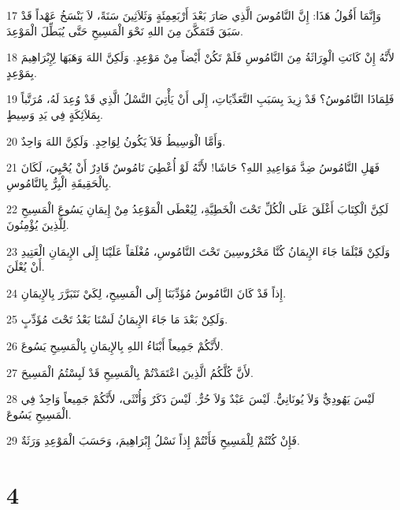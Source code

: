 \par 17 وَإِنَّمَا أَقُولُ هَذَا: إِنَّ النَّامُوسَ الَّذِي صَارَ بَعْدَ أَرْبَعِمِئَةٍ وَثَلاَثِينَ سَنَةً، لاَ يَنْسَخُ عَهْداً قَدْ سَبَقَ فَتَمَكَّنَ مِنَ اللهِ نَحْوَ الْمَسِيحِ حَتَّى يُبَطِّلَ الْمَوْعِدَ.
\par 18 لأَنَّهُ إِنْ كَانَتِ الْوِرَاثَةُ مِنَ النَّامُوسِ فَلَمْ تَكُنْ أَيْضاً مِنْ مَوْعِدٍ. وَلَكِنَّ اللهَ وَهَبَهَا لِإِبْرَاهِيمَ بِمَوْعِدٍ.
\par 19 فَلِمَاذَا النَّامُوسُ؟ قَدْ زِيدَ بِسَبَبِ التَّعَدِّيَاتِ، إِلَى أَنْ يَأْتِيَ النَّسْلُ الَّذِي قَدْ وُعِدَ لَهُ، مُرَتَّباً بِمَلاَئِكَةٍ فِي يَدِ وَسِيطٍ.
\par 20 وَأَمَّا الْوَسِيطُ فَلاَ يَكُونُ لِوَاحِدٍ. وَلَكِنَّ اللهَ وَاحِدٌ.
\par 21 فَهَلِ النَّامُوسُ ضِدَّ مَوَاعِيدِ اللهِ؟ حَاشَا! لأَنَّهُ لَوْ أُعْطِيَ نَامُوسٌ قَادِرٌ أَنْ يُحْيِيَ، لَكَانَ بِالْحَقِيقَةِ الْبِرُّ بِالنَّامُوسِ.
\par 22 لَكِنَّ الْكِتَابَ أَغْلَقَ عَلَى الْكُلِّ تَحْتَ الْخَطِيَّةِ، لِيُعْطَى الْمَوْعِدُ مِنْ إِيمَانِ يَسُوعَ الْمَسِيحِ لِلَّذِينَ يُؤْمِنُونَ.
\par 23 وَلَكِنْ قَبْلَمَا جَاءَ الإِيمَانُ كُنَّا مَحْرُوسِينَ تَحْتَ النَّامُوسِ، مُغْلَقاً عَلَيْنَا إِلَى الإِيمَانِ الْعَتِيدِ أَنْ يُعْلَنَ.
\par 24 إِذاً قَدْ كَانَ النَّامُوسُ مُؤَدِّبَنَا إِلَى الْمَسِيحِ، لِكَيْ نَتَبَرَّرَ بِالإِيمَانِ.
\par 25 وَلَكِنْ بَعْدَ مَا جَاءَ الإِيمَانُ لَسْنَا بَعْدُ تَحْتَ مُؤَدِّبٍ.
\par 26 لأَنَّكُمْ جَمِيعاً أَبْنَاءُ اللهِ بِالإِيمَانِ بِالْمَسِيحِ يَسُوعَ.
\par 27 لأَنَّ كُلَّكُمُ الَّذِينَ اعْتَمَدْتُمْ بِالْمَسِيحِ قَدْ لَبِسْتُمُ الْمَسِيحَ.
\par 28 لَيْسَ يَهُودِيٌّ وَلاَ يُونَانِيٌّ. لَيْسَ عَبْدٌ وَلاَ حُرٌّ. لَيْسَ ذَكَرٌ وَأُنْثَى، لأَنَّكُمْ جَمِيعاً وَاحِدٌ فِي الْمَسِيحِ يَسُوعَ.
\par 29 فَإِنْ كُنْتُمْ لِلْمَسِيحِ فَأَنْتُمْ إِذاً نَسْلُ إِبْرَاهِيمَ، وَحَسَبَ الْمَوْعِدِ وَرَثَةٌ.

\chapter{4}


